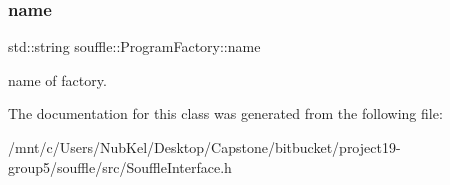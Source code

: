 \subsubsection{\texorpdfstring{name}{name}}
{\footnotesize\ttfamily std\+::string souffle\+::\+Program\+Factory\+::name\hspace{0.3cm}{\ttfamily [protected]}}

name of factory. 

The documentation for this class was generated from the following file\+:\begin{DoxyCompactItemize}
\item 
/mnt/c/\+Users/\+Nub\+Kel/\+Desktop/\+Capstone/bitbucket/project19-\/group5/souffle/src/Souffle\+Interface.\+h\end{DoxyCompactItemize}
